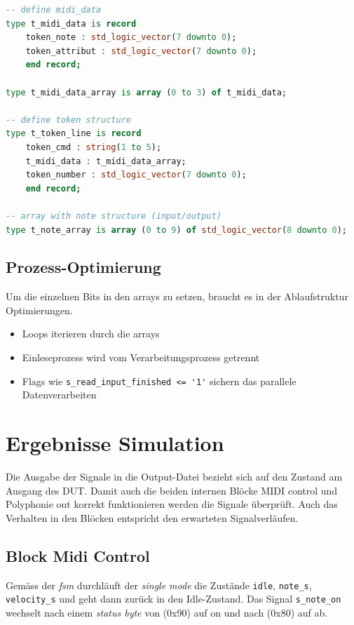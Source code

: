 \begin{lstlisting}[language=vhdl]
-- define midi_data
type t_midi_data is record
    token_note : std_logic_vector(7 downto 0);
    token_attribut : std_logic_vector(7 downto 0);
    end record;

type t_midi_data_array is array (0 to 3) of t_midi_data;

-- define token structure
type t_token_line is record
    token_cmd : string(1 to 5);
    t_midi_data : t_midi_data_array;
    token_number : std_logic_vector(7 downto 0);
    end record;

-- array with note structure (input/output)
type t_note_array is array (0 to 9) of std_logic_vector(8 downto 0);
\end{lstlisting}


\subsection{Prozess-Optimierung}

Um die einzelnen Bits in den arrays zu setzen, braucht es in der Ablaufstruktur Optimierungen.

\begin{itemize}
	\item Loops iterieren durch die arrays
	\item Einleseprozess wird vom Verarbeitungsprozess getrennt
	\item Flags wie \lstinline|s_read_input_finished <= '1'| sichern das parallele Datenverarbeiten
\end{itemize}

\section{Ergebnisse Simulation}\label{sec.ergebnisse_tests}
Die Ausgabe der Signale in die Output-Datei bezieht sich auf den Zustand am Ausgang des DUT. Damit auch die beiden internen Blöcke MIDI control und Polyphonie out korrekt funktionieren werden die Signale überprüft. Auch das Verhalten in den Blöcken entspricht den erwarteten Signalverläufen.

\subsection{Block Midi Control}

Gemäss der \textit{fsm} durchläuft der \textit{single mode}  die Zustände \lstinline|idle|, \lstinline|note_s|, \lstinline|velocity_s| und geht dann zurück  in den Idle-Zustand. Das Signal \lstinline|s_note_on| wechselt nach einem \textit{status byte} von (0x90) auf on und nach (0x80) auf ab.

